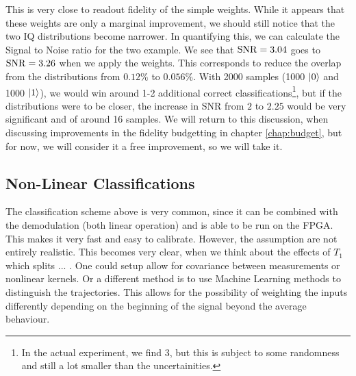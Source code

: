 This is very close to readout fidelity of the simple weights. While it appears that these weights are only a marginal improvement, we should still notice that the two IQ distributions become narrower. In quantifying this, we can calculate the Signal to Noise ratio for the two example. We see that $\operatorname{SNR} = 3.04$ goes to $\operatorname{SNR} = 3.26$ when we apply the weights. This corresponds to reduce the overlap from the distributions from $0.12\%$ to $0.056\%$. With 2000 samples (1000 $\ket{0}$ and 1000 $\ket{1}$), we would win around 1-2 additional correct classifications\footnote{In the actual experiment, we find 3, but this is subject to some randomness and still a lot smaller than the uncertainities.}, but if the distributions were to be closer, the increase in SNR from $2$ to $2.25$ would be very significant and of around 16 samples. We will return to this discussion, when discussing improvements in the fidelity budgetting in chapter \ref{chap:budget}, but for now, we will consider it a free improvement, so we will take it. 


\subsection{Non-Linear Classifications}
The classification scheme above is very common, since it can be combined with the demodulation (both linear operation) and is able to be run on the FPGA. This makes it very fast and easy to calibrate. However, the assumption are not entirely realistic. This becomes very clear, when we think about the effects of $T_1$ which splits ... . One could setup allow for covariance between measurements or nonlinear kernels. Or a different method is to use Machine Learning methods to distinguish the trajectories. This allows for the possibility of weighting the inputs differently depending on the beginning of the signal beyond the average behaviour.



